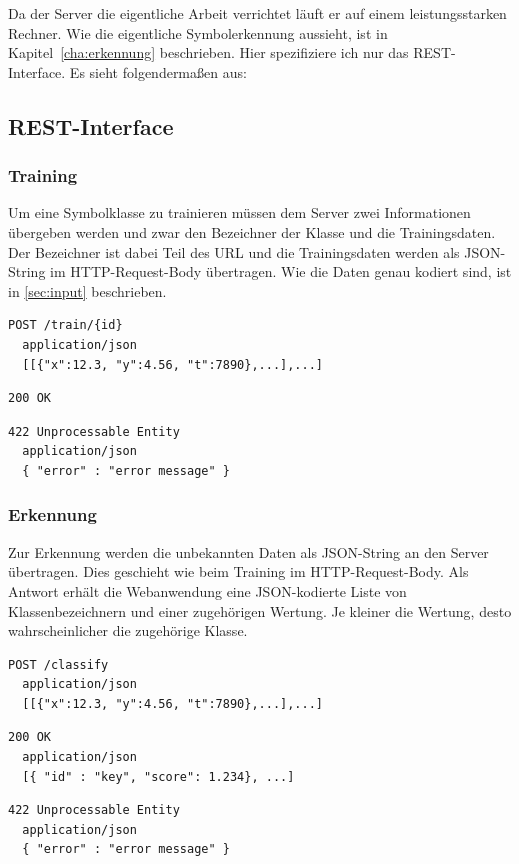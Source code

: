 Da der Server die eigentliche Arbeit verrichtet läuft er auf einem leistungsstarken Rechner. Wie die eigentliche Symbolerkennung aussieht, ist in Kapitel~\ref{cha:erkennung} beschrieben. Hier spezifiziere ich nur das \ac{REST}-Interface. Es sieht folgendermaßen aus:

\subsection{REST-Interface} %
\label{sub:rest_interface}

\subsubsection{Training}

Um eine Symbolklasse zu trainieren müssen dem Server zwei Informationen übergeben werden und zwar den Bezeichner der Klasse und die Trainingsdaten. Der Bezeichner ist dabei Teil des \ac{URL} und die Trainingsdaten werden als \ac{JSON}-String \cite{json} im \ac{HTTP}-Request-Body übertragen. Wie die Daten genau kodiert sind, ist in \ref{sec:input} beschrieben.

\begin{lstlisting}[caption={Anfrage}]
  POST /train/{id}
  application/json
  [[{"x":12.3, "y":4.56, "t":7890},...],...]
\end{lstlisting}
\begin{lstlisting}[caption={Antwort}]
  200 OK
\end{lstlisting}
\begin{lstlisting}[caption={Antwort im Fehlerfall}]
  422 Unprocessable Entity
  application/json
  { "error" : "error message" }
\end{lstlisting}

\subsubsection{Erkennung}
\label{subsub:erkennung}

Zur Erkennung werden die unbekannten Daten als \ac{JSON}-String an den Server übertragen. Dies geschieht wie beim Training im \ac{HTTP}-Request-Body. Als Antwort erhält die Webanwendung eine \ac{JSON}-kodierte Liste von Klassenbezeichnern und einer zugehörigen Wertung. Je kleiner die Wertung, desto wahrscheinlicher die zugehörige Klasse.

\begin{lstlisting}[caption={Anfrage}]
  POST /classify
  application/json
  [[{"x":12.3, "y":4.56, "t":7890},...],...]
\end{lstlisting}
\begin{lstlisting}[caption={Antwort}]
  200 OK
  application/json
  [{ "id" : "key", "score": 1.234}, ...]
\end{lstlisting}
\begin{lstlisting}[caption={Antwort im Fehlerfall}]
  422 Unprocessable Entity
  application/json
  { "error" : "error message" }
\end{lstlisting}

